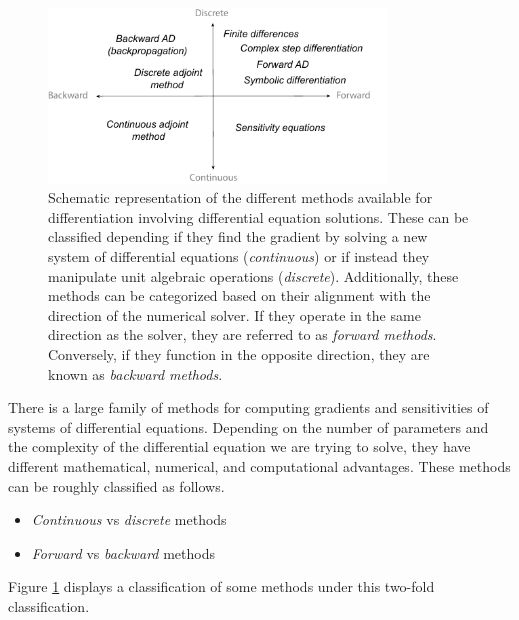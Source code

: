 \begin{figure}[t]
    \centering
    \includegraphics[width=0.80\textwidth]{figures/scheme-methods.pdf}
    \caption{Schematic representation of the different methods available for differentiation involving differential equation solutions. These can be classified depending if they find the gradient by solving a new system of differential equations (\textit{continuous}) or if instead they manipulate unit algebraic operations (\textit{discrete}). Additionally, these methods can be categorized based on their alignment with the direction of the numerical solver. If they operate in the same direction as the solver, they are referred to as \textit{forward methods}. Conversely, if they function in the opposite direction, they are known as \textit{backward methods}.}
    \label{fig:scheme-all-methods}
\end{figure}

There is a large family of methods for computing gradients and sensitivities of systems of differential equations. 
Depending on the number of parameters and the complexity of the differential equation we are trying to solve, they have different mathematical, numerical, and computational advantages.
These methods can be roughly classified as  follows\cite{ma2021comparison}. 
\begin{itemize}
    \item \textit{Continuous} vs \textit{discrete}  methods
    \item \textit{Forward} vs \textit{backward} methods
\end{itemize}
Figure \ref{fig:scheme-all-methods} displays a classification of some methods under this two-fold classification. 

